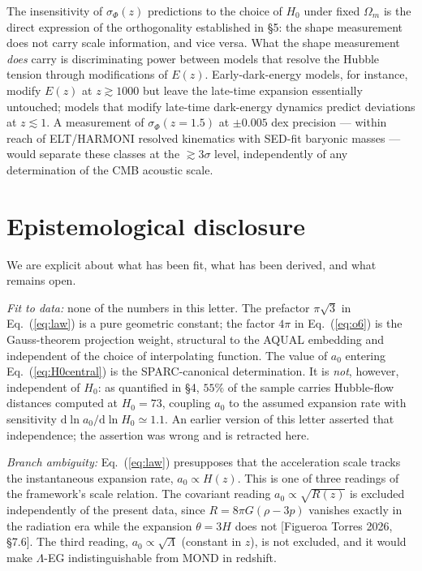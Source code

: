\documentclass[11pt,a4paper]{article}
\begin{document}
The insensitivity of $\sigma_\Phi(z)$ predictions to the choice of $H_0$
under fixed $\Omega_m$ is the direct expression of the orthogonality
established in \S5: the shape measurement does not carry scale information,
and vice versa. What the shape measurement \emph{does} carry is
discriminating power between models that resolve the Hubble tension through
modifications of $E(z)$. Early-dark-energy models, for instance, modify
$E(z)$ at $z \gtrsim 1000$ but leave the late-time expansion essentially
untouched; models that modify late-time dark-energy dynamics predict
deviations at $z \lesssim 1$. A measurement of $\sigma_\Phi(z=1.5)$ at
$\pm 0.005$ dex precision --- within reach of ELT/HARMONI resolved
kinematics with SED-fit baryonic masses --- would separate these classes at
the $\gtrsim 3\sigma$ level, independently of any determination of the CMB
acoustic scale.

\section{Epistemological disclosure}

We are explicit about what has been fit, what has been derived, and what
remains open.

\emph{Fit to data:} none of the numbers in this letter. The prefactor
$\pi\sqrt{3}$ in Eq.~(\ref{eq:law}) is a pure geometric constant; the
factor $4\pi$ in Eq.~(\ref{eq:o6}) is the Gauss-theorem projection weight,
structural to the AQUAL embedding and independent of the choice of
interpolating function. The value of $a_0$ entering
Eq.~(\ref{eq:H0central}) is the SPARC-canonical determination. It is
\emph{not}, however, independent of $H_0$: as quantified in \S4, $55\%$ of
the sample carries Hubble-flow distances computed at $H_0 = 73$, coupling
$a_0$ to the assumed expansion rate with sensitivity
$\mathrm{d}\ln a_0/\mathrm{d}\ln H_0 \simeq 1.1$. An earlier version of this
letter asserted that independence; the assertion was wrong and is retracted
here.

\emph{Branch ambiguity:} Eq.~(\ref{eq:law}) presupposes that the
acceleration scale tracks the instantaneous expansion rate,
$a_0 \propto H(z)$. This is one of three readings of the framework's scale
relation. The covariant reading $a_0 \propto \sqrt{R(z)}$ is excluded
independently of the present data, since $R = 8\pi G(\rho - 3p)$ vanishes
exactly in the radiation era while the expansion $\theta = 3H$ does not
[Figueroa Torres 2026, \S7.6]. The third reading, $a_0 \propto \sqrt{\Lambda}$
(constant in $z$), is not excluded, and it would make $\Lambda$-EG
indistinguishable from MOND in redshift.
\end{document}
